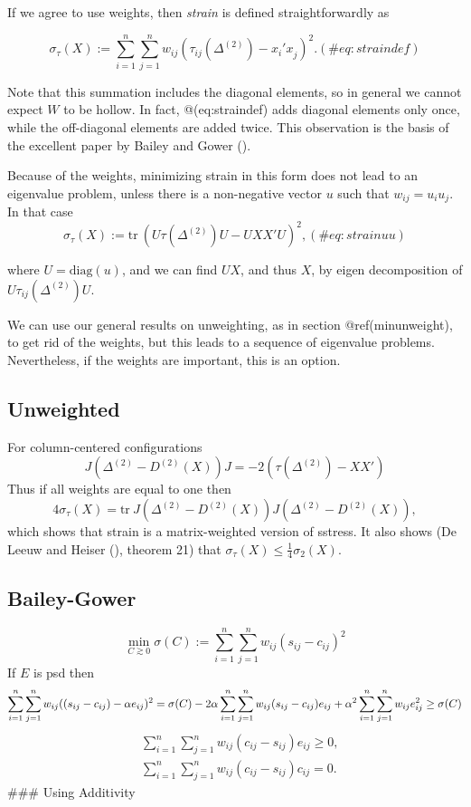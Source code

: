 \documentclass[
  12pt,
  letterpaper,
  DIV=11,
  numbers=noendperiod]{scrreprt}
\theoremstyle{remark}
\begin{document}
If we agree to use weights, then \emph{strain} is defined
straightforwardly as

\begin{equation}
\sigma_\tau(X):=\sum_{i=1}^n\sum_{j=1}^nw_{ij}(\tau_{ij}(\Delta^{(2)})-x_i'x_j^{\ })^2.
(\#eq:straindef)
\end{equation}

Note that this summation includes the diagonal elements, so in general
we cannot expect \(W\) to be hollow. In fact, @(eq:straindef) adds
diagonal elements only once, while the off-diagonal elements are added
twice. This observation is the basis of the excellent paper by Bailey
and Gower ().

Because of the weights, minimizing strain in this form does not lead to
an eigenvalue problem, unless there is a non-negative vector \(u\) such
that \(w_{ij}=u_iu_j\). In that case \begin{equation}
\sigma_\tau(X):=\text{tr}\ (U\tau(\Delta^{(2)})U-UXX'U)^2,
(\#eq:strainuu)
\end{equation}

where \(U=\text{diag}(u)\), and we can find \(UX\), and thus \(X\), by
eigen decomposition of \(U\tau_{ij}(\Delta^{(2)})U\).

We can use our general results on unweighting, as in section
@ref(minunweight), to get rid of the weights, but this leads to a
sequence of eigenvalue problems. Nevertheless, if the weights are
important, this is an option.

\subsection{Unweighted}\label{unweighted}

For column-centered configurations \[
J(\Delta^{(2)}-D^{(2)}(X))J=-2(\tau(\Delta^{(2)})-XX')
\] Thus if all weights are equal to one then \[
4\sigma_\tau(X)=\text{tr}\ J(\Delta^{(2)}-D^{(2)}(X))J(\Delta^{(2)}-D^{(2)}(X)),
\] which shows that strain is a matrix-weighted version of sstress. It
also shows (De Leeuw and Heiser
(), theorem 21) that
\(\sigma_\tau(X)\leq\frac14\sigma_2(X).\)

\subsection{Bailey-Gower}\label{bailey-gower}

\[
\min_{C\gtrsim 0}\sigma(C):=\sum_{i=1}^n\sum_{j=1}^nw_{ij}(s_{ij}-c_{ij})^2
\] If \(E\) is psd then \[
\sum_{i=1}^n\sum_{j=1}^nw_{ij}((s_{ij}-c_{ij})-\alpha e_{ij})^2=\\\sigma(C)-2\alpha\sum_{i=1}^n\sum_{j=1}^nw_{ij}(s_{ij}-c_{ij})e_{ij}+\alpha^2\sum_{i=1}^n\sum_{j=1}^nw_{ij}e_{ij}^2\geq\sigma(C)
\] \begin{align}
&\sum_{i=1}^n\sum_{j=1}^nw_{ij}(c_{ij}-s_{ij})e_{ij}\geq 0,\\
&\sum_{i=1}^n\sum_{j=1}^nw_{ij}(c_{ij}-s_{ij})c_{ij}=0.
\end{align} \#\#\# Using Additivity
\end{document}

